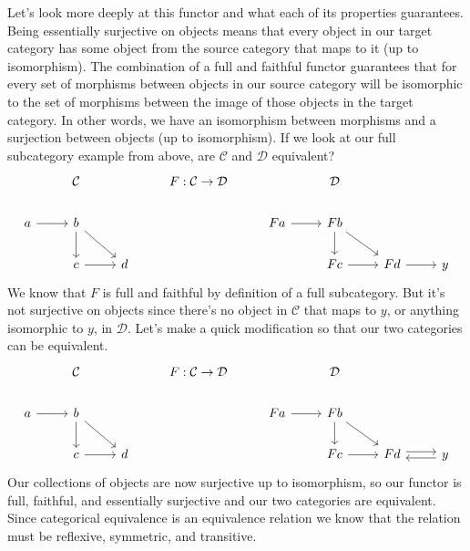 \documentclass[12pt]{article}
\newcounter{examp}
\begin{document}
Let's look more deeply at this functor and what each of its properties guarantees.
Being essentially surjective on objects means that every object in our target category has some object from the source category that maps to it (up to isomorphism).
The combination of a full and faithful functor guarantees that for every set of morphisms between objects in our source category will be isomorphic to the set of morphisms between the image of those objects in the target category.
In other words, we have an isomorphism between morphisms and a surjection between objects (up to isomorphism).
If we look at our full subcategory example from above, are $\mathcal{C}$ and $\mathcal{D}$ equivalent?
\[\begin{tikzcd}
        & {\mathcal{C}} && {F:\mathcal{C}\rightarrow\mathcal{D}} && {\mathcal{D}} \\
        a & b &&& Fa & Fb \\
        & c & d &&& Fc & Fd & y
        \arrow[from=2-1, to=2-2]
        \arrow[from=2-2, to=3-2]
        \arrow[from=3-2, to=3-3]
        \arrow[from=2-2, to=3-3]
        \arrow[from=2-5, to=2-6]
        \arrow[from=2-6, to=3-7]
        \arrow[from=3-6, to=3-7]
        \arrow[from=2-6, to=3-6]
        \arrow[from=3-7, to=3-8]
    \end{tikzcd}\]
We know that $F$ is full and faithful by definition of a full subcategory.
But it's not surjective on objects since there's no object in $\mathcal{C}$ that maps to $y$, or anything isomorphic to $y$, in $\mathcal{D}$.
Let's make a quick modification so that our two categories can be equivalent.
\[\begin{tikzcd}
        & {\mathcal{C}} && {F:\mathcal{C}\rightarrow\mathcal{D}} && {\mathcal{D}} \\
        a & b &&& Fa & Fb \\
        & c & d &&& Fc & Fd & y
        \arrow[from=2-1, to=2-2]
        \arrow[from=2-2, to=3-2]
        \arrow[from=3-2, to=3-3]
        \arrow[from=2-2, to=3-3]
        \arrow[from=2-5, to=2-6]
        \arrow[from=2-6, to=3-7]
        \arrow[from=3-6, to=3-7]
        \arrow[from=2-6, to=3-6]
        \arrow[shift left, from=3-7, to=3-8]
        \arrow[shift left, from=3-8, to=3-7]
    \end{tikzcd}\]
Our collections of objects are now surjective up to isomorphism, so our functor is full, faithful, and essentially surjective and our two categories are equivalent.
Since categorical equivalence is an equivalence relation we know that the relation must be reflexive, symmetric, and transitive.
\end{document}
